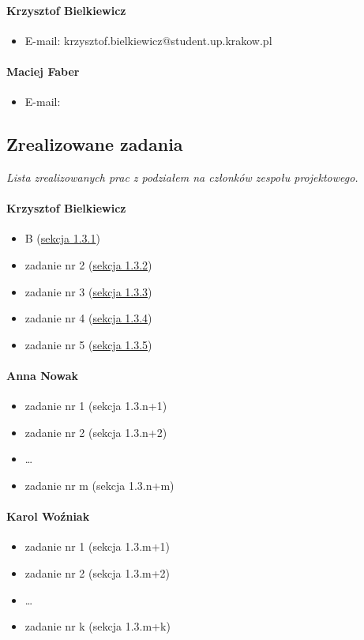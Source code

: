 \documentclass[12pt,a4paper,oneside]{article}
\theoremstyle{definition}
\numberwithin{equation}{section}
\begin{document}
    \paragraph{Krzysztof Bielkiewicz}
    \begin{itemize}
        \item E-mail:  krzysztof.bielkiewicz@student.up.krakow.pl
    \end{itemize}
    \paragraph{Maciej Faber}
    \begin{itemize}
        \item E-mail:
    \end{itemize}

\subsection{Zrealizowane zadania}
\textit{Lista zrealizowanych prac z podziałem na członków zespołu projektowego.}
\paragraph{Krzysztof Bielkiewicz}
\begin{itemize}
\item B (\hyperref[1.3.1]{sekcja 1.3.1})
\item zadanie nr 2 (\hyperref[1.3.2]{sekcja 1.3.2})
\item zadanie nr 3 (\hyperref[1.3.3]{sekcja 1.3.3})
\item zadanie nr 4 (\hyperref[1.3.4]{sekcja 1.3.4})
\item zadanie nr 5 (\hyperref[1.3.5]{sekcja 1.3.5})
\end{itemize}
\paragraph{Anna Nowak}
\begin{itemize}
\item zadanie nr 1 (sekcja 1.3.n+1)
\item zadanie nr 2 (sekcja 1.3.n+2)
\item \dots
\item zadanie nr m (sekcja 1.3.n+m)
\end{itemize}
\paragraph{Karol Woźniak}
\begin{itemize}
\item zadanie nr 1 (sekcja 1.3.m+1)
\item zadanie nr 2 (sekcja 1.3.m+2)
\item \dots
\item zadanie nr k (sekcja 1.3.m+k)

\end{itemize}
\end{document}
